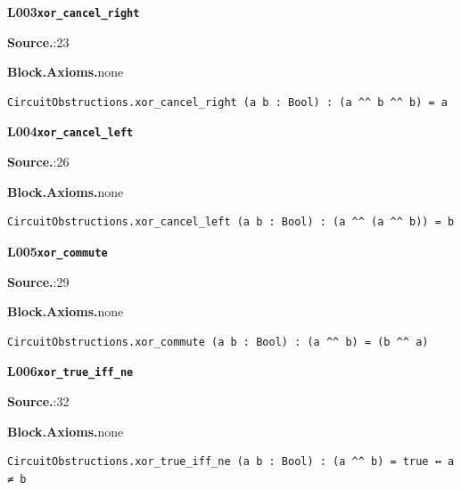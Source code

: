 \par\medskip\noindent\begin{minipage}{\textwidth}
{\small\bfseries L003\enspace\texttt{xor\_cancel\_right}\par}
{\footnotesize\raggedright\textbf{Source.}\enspace{}:23\par
\textbf{Block.}\quad\textbf{Axioms.}\enspace none\par}\nopagebreak
\begin{lstlisting}
CircuitObstructions.xor_cancel_right (a b : Bool) : (a ^^ b ^^ b) = a
\end{lstlisting}
\end{minipage}\par

\par\medskip\noindent\begin{minipage}{\textwidth}
{\small\bfseries L004\enspace\texttt{xor\_cancel\_left}\par}
{\footnotesize\raggedright\textbf{Source.}\enspace{}:26\par
\textbf{Block.}\quad\textbf{Axioms.}\enspace none\par}\nopagebreak
\begin{lstlisting}
CircuitObstructions.xor_cancel_left (a b : Bool) : (a ^^ (a ^^ b)) = b
\end{lstlisting}
\end{minipage}\par

\par\medskip\noindent\begin{minipage}{\textwidth}
{\small\bfseries L005\enspace\texttt{xor\_commute}\par}
{\footnotesize\raggedright\textbf{Source.}\enspace{}:29\par
\textbf{Block.}\quad\textbf{Axioms.}\enspace none\par}\nopagebreak
\begin{lstlisting}
CircuitObstructions.xor_commute (a b : Bool) : (a ^^ b) = (b ^^ a)
\end{lstlisting}
\end{minipage}\par

\par\medskip\noindent\begin{minipage}{\textwidth}
{\small\bfseries L006\enspace\texttt{xor\_true\_iff\_ne}\par}
{\footnotesize\raggedright\textbf{Source.}\enspace{}:32\par
\textbf{Block.}\quad\textbf{Axioms.}\enspace none\par}\nopagebreak
\begin{lstlisting}
CircuitObstructions.xor_true_iff_ne (a b : Bool) : (a ^^ b) = true ↔ a ≠ b
\end{lstlisting}
\end{minipage}\par

